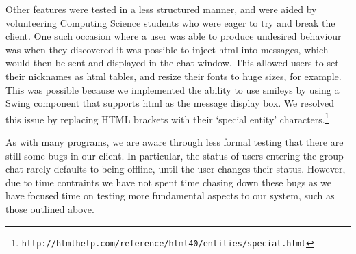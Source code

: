 Other features were tested in a less structured manner, and were aided by volunteering Computing Science students who were eager to try and break the client. One such occasion where a user was able to produce undesired behaviour was when they discovered it was possible to inject html into messages, which would then be sent and displayed in the chat window. This allowed users to set their nicknames as html tables, and resize their fonts to huge sizes, for example. This was possible because we implemented the ability to use smileys by using a Swing component that supports html as the message display box. We resolved this issue by replacing HTML brackets with their `special entity' characters.\footnote{\texttt{http://htmlhelp.com/reference/html40/entities/special.html}}

As with many programs, we are aware through less formal testing that there are still some bugs in our client. In particular, the status of users entering the group chat rarely defaults to being offline, until the user changes their status. However, due to time contraints we have not spent time chasing down these bugs as we have focused time on testing more fundamental aspects to our system, such as those outlined above. 

